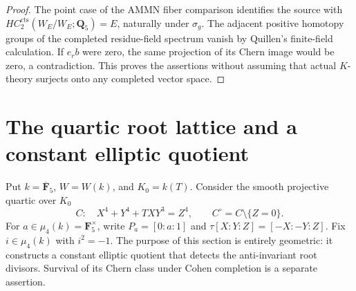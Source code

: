 \documentclass[11pt,a4paper]{article}
\theoremstyle{remark}
\begin{document}
\begin{proof}
The point case of the AMMN fiber comparison identifies the source
with $HC_2^{\mathrm{cts}}(W_E/W_E;\mathbf Q_5)=E$, naturally
under $\sigma_g$.  The adjacent positive homotopy groups of the
completed residue-field spectrum vanish by Quillen's finite-field
calculation.  If $e_rb$ were zero, the same projection of its
Chern image would be zero, a contradiction.  This proves the
assertions without assuming that actual $K$-theory surjects onto
any completed vector space.
\end{proof}



\section{The quartic root lattice and a constant elliptic quotient}
\label{sec:quarticellipticgeometry}

Put $k=\overline{\mathbf F}_5$, $W=W(k)$, and $K_0=k(T)$.
Consider the smooth projective quartic over $K_0$
\[
 C:\quad X^4+Y^4+TXY^3=Z^4,
 \qquad C^\circ=C\setminus\{Z=0\}.
\]
For $a\in\mu_4(k)=\mathbf F_5^\times$, write
$P_a=[0:a:1]$ and
$\tau[X:Y:Z]=[-X:-Y:Z]$. Fix $i\in\mu_4(k)$ with $i^2=-1$.
The purpose of this section is entirely geometric: it constructs a
constant elliptic quotient that detects the anti-invariant root
divisors. Survival of its Chern class under Cohen completion is a
separate assertion.
\end{document}

